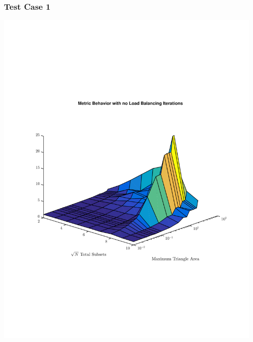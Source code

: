 \documentclass[]{beamer}
\begin{document}
\begin{frame}[t]\frametitle{Test Case 1}
\centering
\includegraphics[scale=0.47, trim = 0cm 8cm 0cm 7cm]{figures/OppNoIter.pdf}
\end{frame}
\end{document}
